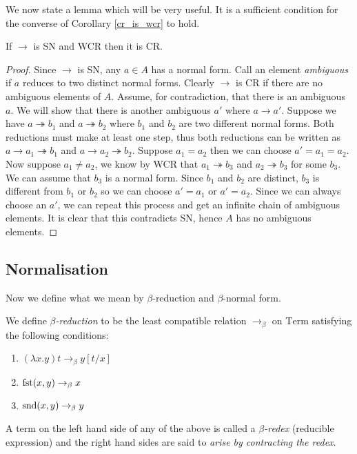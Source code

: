 We now state a lemma which will be very useful. It is a sufficient condition for the converse of Corollary \ref{cr_is_wcr} to hold.

\begin{lemma}
    If $\to$ is SN and WCR then it is CR.
\end{lemma}

\begin{proof}
    Since $\to$ is SN, any $a \in A$ has a normal form. Call an element \emph{ambiguous} if $a$ reduces to two distinct normal forms. Clearly $\to$ is CR if there are no ambiguous elements of $A$.
    Assume, for contradiction, that there is an ambiguous $a$. We will show that there is another ambiguous $a'$ where $a \to a'$.
    Suppose we have $a \twoheadrightarrow b_1$ and $a \twoheadrightarrow b_2$ where $b_1$ and $b_2$ are two different normal forms. Both reductions must make at least one step, thus both reductions can be written as $a \to a_1 \twoheadrightarrow b_1$ and $a \to a_2 \twoheadrightarrow b_2$.
    Suppose $a_1 = a_2$ then we can choose $a' = a_1 = a_2$. Now suppose $a_1 \neq a_2$, we know by WCR that $a_1 \twoheadrightarrow b_3$ and $a_2 \twoheadrightarrow b_3$ for some $b_3$. We can assume that $b_3$ is a normal form. Since $b_1$ and $b_2$ are distinct, $b_3$ is different from $b_1$ or $b_2$ so we can choose $a' = a_1$ or $a'=a_2$.
    Since we can always choose an $a'$, we can repeat this process and get an infinite chain of ambiguous elements. It is clear that this contradicts SN, hence $A$ has no ambiguous elements.
\end{proof}

\subsection{Normalisation}

Now we define what we mean by $\beta$-reduction and $\beta$-normal form.

\begin{defin}
    We define \emph{$\beta$-reduction} to be the least compatible relation $\to_{\beta}$ on $\mathrm{Term}$ satisfying the following conditions:
    \begin{enumerate}
        \item $(\lambda x . y)t \to_{\beta} y [t / x]$
        \item $\mathrm{fst}(x,y) \to_{\beta} x$
        \item $\mathrm{snd}(x,y) \to_{\beta} y$
    \end{enumerate}
    A term on the left hand side of any of the above is called a \emph{$\beta$-redex} (reducible expression) and the right hand sides are said to \emph{arise by contracting the redex}.
\end{defin}


